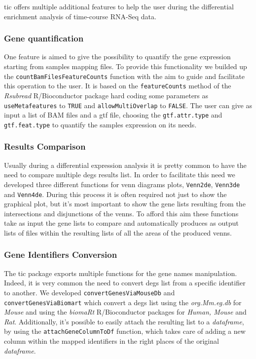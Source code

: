 \gls{tic} offers multiple additional features to help the user during the differential enrichment analysis of time-course RNA-Seq data.

\subsubsection*{Gene quantification}

One feature is aimed to give the possibility to quantify the gene expression starting from samples mapping files. 
To provide this functionality we builded up the \lstinline!countBamFilesFeatureCounts! function with the aim to guide and facilitate this operation to the user.
It is based on the \lstinline!featureCounts! method of the \textit{Rsubread} R/Bioconductor package \cite{Liao2013} hard coding some parameters as \lstinline!useMetafeatures! to \lstinline!TRUE! and \lstinline!allowMultiOverlap! to \lstinline!FALSE!.
The user can give as input a list of BAM files and a \gls{gtf} file, choosing  the \lstinline!gtf.attr.type! and \lstinline!gtf.feat.type! to quantify the samples expression on its needs.

\subsubsection*{Results Comparison}

Usually during a differential expression analysis it is pretty common to have the need to compare multiple \glspl{deg} results list.
In order to facilitate this need we developed three different functions for venn diagrams plots, \lstinline!Venn2de!, \lstinline!Venn3de! and \lstinline!Venn4de!.
During this process it is often required not just to show the graphical plot, but it's most important to show the gene lists resulting from the intersections and disjunctions of the venns.
To afford this aim these functions take as input the gene lists to compare and automatically produces as output lists of files within the resulting lists of all the areas of the produced venns.

\subsubsection*{Gene Identifiers Conversion}

The \gls{tic} package exports multiple functions for the gene names manipulation. 
Indeed, it is very common the need to convert \glspl{deg} list from a specific identifier to another.
We developed \lstinline!convertGenesViaMouseDb! and \lstinline!convertGenesViaBiomart! which convert a \glspl{deg} list using the \textit{org.Mm.eg.db} \cite{Carlson2018} for \textit{Mouse} and using the \textit{biomaRt} R/Bioconductor packages for \textit{Human, Mouse} and \textit{Rat}.
Additionally, it's possible to easily attach the resulting list to a \textit{dataframe}, by using the \lstinline!attachGeneColumnToDf! function, which takes care of adding a new column within the mapped identifiers in the right places of the original \textit{dataframe}.

